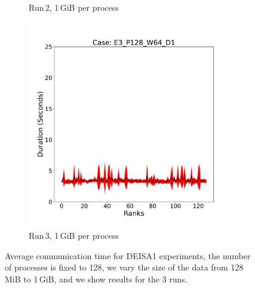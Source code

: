 \begin{figure}[h!]
\begin{subfigure}[b]{0.3\textwidth}
         \caption{Run\,2, 1\,GiB per process}
         \label{fig:E2_1_d11}
     \end{subfigure}
      \hfill
     \begin{subfigure}[b]{0.3\textwidth}
         \centering
         \includegraphics[width=\textwidth, height=\textwidth]{figures/deisa1__E3_P128_W64_D1.pdf}
         \caption{Run\,3, 1\,GiB per process}
         \label{fig:E3_1_d11}
     \end{subfigure}
        \caption{Average communication time for DEISA1 experiments, the number of processes is fixed to 128, we vary the size of the data from 128\,MiB to 1\,GiB, and we show results for the 3 runs.}
        \label{fig:variability11}
\end{figure}



